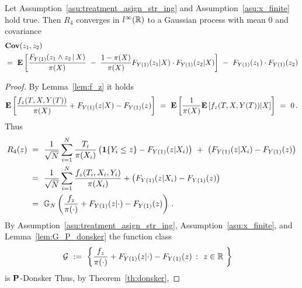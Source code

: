 \begin{lemma}
  \label{aa:mean:l:r4}
  Let
  Assumption~\eqref{asu:treatment_asign_str_ing} and Assumption~\ref{asu:x_finite} hold true.
  Then
  $R_4$ 
  converges in
  $l^\infty(\R)$
  to a Gaussian process with mean 0 and covariance
\begin{align*}
  &
  \mathbf{Cov}
  (z_1,z_2)
  \\
  &
  =\ 
  \E
  \left[ 
 \frac{
 F_{Y(1)}(z_1 \land z_2\,|\,X)
}{\pi(X)}
\ 
-
\ 
 \frac{1-\pi(X)}{\pi(X)}
 F_{Y(1)}(z_1|X)
 \cdot
 F_{Y(1)}(z_2|X)
  \right]
  \ 
 -
 \ 
 F_{Y(1)}(z_1)
 \cdot
 F_{Y(1)}(z_2)
\end{align*}

\end{lemma}
\begin{proof}
  By Lemma~\ref{lem:f_z} it holds
  \begin{align*}
    \E
    \left[
      \frac{f_z(T,X,Y(T))}{\pi(X)}
      +
      F_{Y(1)}(z|X)
      -
      F_{Y(1)}(z)
      \right]
      \ 
      =
      \ 
      \E
      \left[
      \frac{1}{\pi(X)}
      \E
      \left[
        f_z(T,X,Y(T))
        |X
      \right]
      \right]
      \ 
      =
      \ 
      0
      \,.
  \end{align*}
  Thus
  \begin{align*}
    R_4(z)
    &
  \
  =
  \ 
  \frac{1}{
  \sqrt{N}
  }
    \sum_{i=1}^{N} 
    \frac{T_i}{\pi(X_i)}
    \left( 
    \mathbf{1}{\left\{ Y_i \le z \right\}}
    -
  F_{Y(1)}(z|X_i)
    \right)
    \ 
    +
    \ 
    \left( 
  F_{Y(1)}(z|X_i)
    -
  F_{Y(1)}(z)
    \right)
    \\
    &
    \ 
  =
    \ 
  \frac{1}{
  \sqrt{N}
  }
    \sum_{i=1}^{N} 
      \frac{f_z(T_i,X_i,Y_i)}{\pi(X_i)}
      +
      \left( 
      F_{Y(1)}(z|X_i)
      -
      F_{Y(1)}(z)
      \right)
      \\
      &
      \ 
      =
      \ 
      \G_N 
      \left(
       \frac{f_z}{\pi(\cdot)}
      +
      F_{Y(1)}(z|\cdot)
      -
      F_{Y(1)}(z)
      \right)
      \,.
  \end{align*}
  By Assumption~\eqref{asu:treatment_asign_str_ing}, Assumption~\ref{asu:x_finite},
and
Lemma~\ref{lem:G_P_donsker}
the function class 
\begin{align*}
  \mathcal{G}
    &
    \ 
    :=
    \ 
    \left\{ 
      \frac{f_z}{\pi(\cdot)}
      +
      F_{Y(1)}(z|\cdot)
      -
      F_{Y(1)}(z)
      \ 
      \colon
      \ 
      z\in\R\ 
    \right\}
\end{align*}
is $\P$-Donsker
Thus, by Theorem~\ref{th:donsker},

\end{proof}
